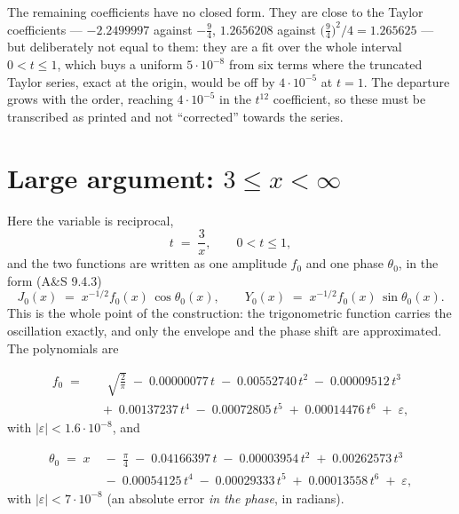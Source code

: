 \documentclass[11pt,a4paper]{article}
\begin{document}
The remaining coefficients have no closed form. They are close to the Taylor
coefficients --- $-2.2499997$ against $-\tfrac{9}{4}$, $1.2656208$ against
$\big(\tfrac{9}{4}\big)^{2}\!/4 = 1.265625$ --- but deliberately not equal to
them: they are a fit over the whole interval $0<t\le1$, which buys a uniform
$5\cdot10^{-8}$ from six terms where the truncated Taylor series, exact at the
origin, would be off by $4\cdot10^{-5}$ at $t=1$. The departure grows with the
order, reaching $4\cdot10^{-5}$ in the $t^{12}$ coefficient, so these must be
transcribed as printed and not ``corrected'' towards the series.

\section{Large argument: $3 \le x < \infty$}

Here the variable is reciprocal,
%
\begin{equation}
  t \;=\; \frac{3}{x}, \qquad 0 < t \le 1 ,
\end{equation}
%
and the two functions are written as one amplitude $f_0$ and one phase
$\theta_0$, in the form (A\&S 9.4.3)
%
\begin{equation}
  J_0(x) \;=\; x^{-1/2} f_0(x)\,\cos\theta_0(x),
  \qquad
  Y_0(x) \;=\; x^{-1/2} f_0(x)\,\sin\theta_0(x).
  \label{eq:modphase}
\end{equation}
%
This is the whole point of the construction: the trigonometric function
carries the oscillation exactly, and only the envelope and the phase shift are
approximated. The polynomials are

\begin{equation}
\begin{aligned}
  f_0 \;=\;
      &\;\;\; \sqrt{\frac{2}{\pi}}
      \;-\; 0.00000077\,t
      \;-\; 0.00552740\,t^{2}
      \;-\; 0.00009512\,t^{3}\\
      &\;+\; 0.00137237\,t^{4}
      \;-\; 0.00072805\,t^{5}
      \;+\; 0.00014476\,t^{6}
      \;+\; \varepsilon ,
\end{aligned}
\label{eq:f0}
\end{equation}
%
with $|\varepsilon| < 1.6\cdot10^{-8}$, and

\begin{equation}
\begin{aligned}
  \theta_0 \;=\; x
      &\;-\; \frac{\pi}{4}
      \;-\; 0.04166397\,t
      \;-\; 0.00003954\,t^{2}
      \;+\; 0.00262573\,t^{3}\\
      &\;-\; 0.00054125\,t^{4}
      \;-\; 0.00029333\,t^{5}
      \;+\; 0.00013558\,t^{6}
      \;+\; \varepsilon ,
\end{aligned}
\label{eq:theta0}
\end{equation}
%
with $|\varepsilon| < 7\cdot10^{-8}$ (an absolute error \emph{in the phase},
in radians).
\end{document}
